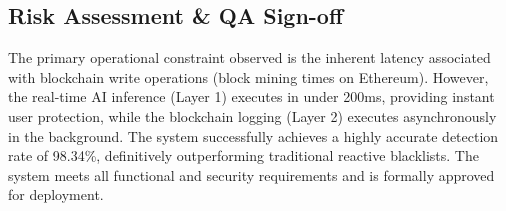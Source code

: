 \subsection{Risk Assessment \& QA Sign-off}
The primary operational constraint observed is the inherent latency associated with blockchain write operations (block mining times on Ethereum). However, the real-time AI inference (Layer 1) executes in under 200ms, providing instant user protection, while the blockchain logging (Layer 2) executes asynchronously in the background. The system successfully achieves a highly accurate detection rate of 98.34\%, definitively outperforming traditional reactive blacklists. The system meets all functional and security requirements and is formally approved for deployment.